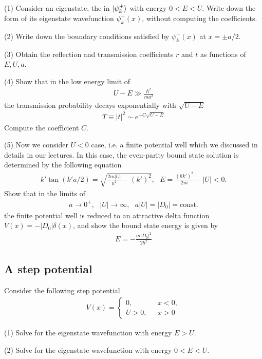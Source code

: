 (1) Consider an eigenstate, the in $|{\psi_k^+}\rangle$ with energy $0<E<U$. Write down the form of its eigenstate wavefunction $\psi_k^+(x)$, without computing the coefficients. 

(2) Write down the boundary conditions satisfied by $\psi_k^+(x)$ at $x=\pm a/2$.

(3) Obtain the reflection and transmission coefficients $r$ and $t$ as functions of $E,U,a$. 

(4) Show that in the low energy limit of 
\begin{align}
U-E\gg\frac{\hbar^2}{ma^2}
\end{align}
the transmission probability decays exponentially with $\sqrt{U-E}$
\begin{align}
T\equiv|t|^2\sim e^{-C\sqrt{U-E}}
\end{align}
Compute the coefficient $C$. 

(5) Now we consider $U<0$ case, i.e. a finite potential well which we discussed in details in our lectures. In this case, the even-parity bound state solution is determined by the following equation
\begin{align}
    k'\tan(k'a/2)=\sqrt{\frac{2m|U|}{\hbar^2}-(k')^2},~~~E=\frac{(\hbar k')^2}{2m}-|U|<0.
\end{align}
Show that in the limits of
\begin{align}
    a\rightarrow0^+,~~~|U|\rightarrow\infty,~~~a|U|=|D_0|=\text{const.}
\end{align}
the finite potential well is reduced to an attractive delta function $V(x)=-|D_0|\delta(x)$, and show the bound state energy is given by
\begin{align}
    E=-\frac{m|D_0|^2}{2\hbar^2}
\end{align}

\subsection{A step potential}

Consider the following step potential 
\begin{align}
V(x)=\begin{cases}
    0,~~~&x<0,\\
    U>0,~~~&x>0
\end{cases}
\end{align}

(1) Solve for the eigenstate wavefunction with energy $E>U$.

(2) Solve for the eigenstate wavefunction with energy $0<E<U$. 